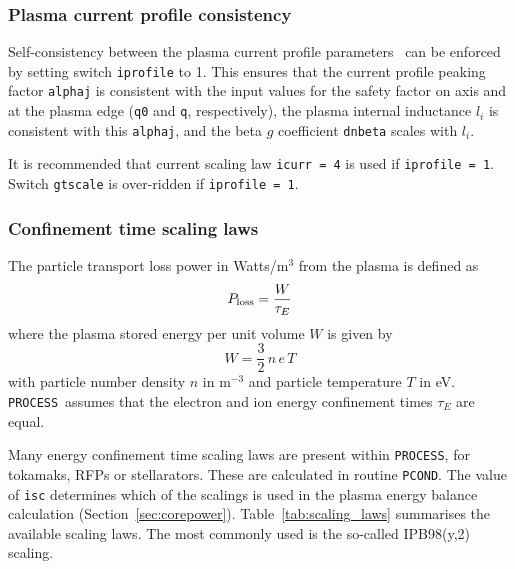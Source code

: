 \documentclass[11pt,a4paper]{report}
\newcommand{\process}{\mbox{\texttt{PROCESS}}}
\begin{document}
\subsubsection{Plasma current profile consistency}
\label{sec:current_profile}

Self-consistency between the plasma current profile
parameters~\cite{DEMOPhysicsGuidelines} can be enforced by setting switch
\texttt{iprofile} to 1. This ensures that the current profile peaking factor
\texttt{alphaj} is consistent with the input values for the safety factor on
axis and at the plasma edge (\texttt{q0} and \texttt{q}, respectively), the
plasma internal inductance $l_i$ is consistent with this \texttt{alphaj}, and
the beta $g$ coefficient \texttt{dnbeta} scales with $l_i$.

It is recommended that current scaling law \texttt{icurr = 4} is used if
\texttt{iprofile = 1}. Switch \texttt{gtscale} is over-ridden if
\texttt{iprofile = 1}.

\subsubsection{Confinement time scaling laws}
\label{sec:taue}

The particle transport loss power in Watts/m$^3$ from the plasma is defined as
\begin{equation}
P_{\mbox{\scriptsize loss}} = \frac{W}{\tau_E}
\label{eqn:ploss}
\end{equation}
where the plasma stored energy per unit volume $W$ is given by
\[
W = \frac{3}{2} \,n \, e \, T
\]
with particle number density $n$ in m$^{-3}$ and particle temperature $T$ in
eV. \process\ assumes that the electron and ion energy confinement times
$\tau_E$ are equal.

Many energy confinement time scaling laws are present within \process, for
tokamaks, RFPs or stellarators. These are calculated in routine
\texttt{PCOND}. The value of \texttt{isc} determines which of the scalings is
used in the plasma energy balance calculation (Section~\ref{sec:corepower}).
Table~\ref{tab:scaling_laws} summarises the available scaling laws.  The most commonly used is the so-called IPB98(y,2) scaling.
\end{document}
